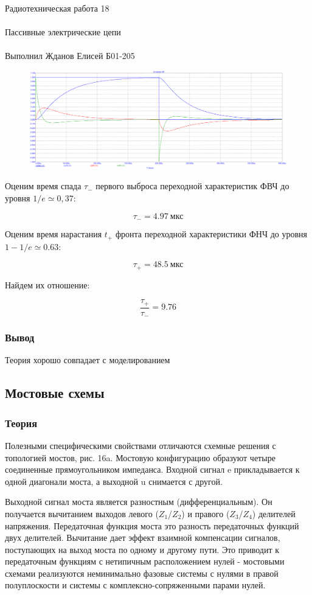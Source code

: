 \documentclass{astroedu-lab}
\begin{document}
\begin{problem}{\huge Радиотехническая работа 18\\\\Пассивные электрические цепи\\\\Выполнил Жданов Елисей Б01-205}
\begin{figure}[!h]
	\centering
	\includegraphics[width=1\textwidth]{2_3.png}
	\label{fig:boiler}
\end{figure}

Оценим время спада $\tau_-$ первого выброса переходной характеристик ФВЧ до уровня $1/e \simeq 0,37$:

\[\tau_-= 4.97 \: \text{мкс}\]

Оценим время нарастания $t_+$ фронта переходной характеристики ФНЧ до уровня $1 - 1/e \simeq 0.63$:

\[\tau_+ = 48.5 \: \text{мкс}\]

Найдем их отношение:

\[\frac{\tau_+}{\tau_-} = 9.76\]


\subsubsection{Вывод}

Теория хорошо совпадает с моделированием

\subsection{Мостовые схемы}

\subsubsection{Теория}

Полезными специфическими свойствами отличаются схемные
решения с топологией мостов, рис. 16a. Мостовую конфигурацию образуют четыре соединенные прямоугольником импеданса. Входной сигнал e прикладывается к одной диагонали моста, а выходной u снимается с другой.

Выходной сигнал моста является разностным (дифференциальным). Он получается вычитанием выходов левого ($Z_1$/$Z_2$) и правого ($Z_3$/$Z_4$) делителей напряжения. Передаточная функция моста это разность передаточных функций двух делителей. Вычитание дает эффект взаимной компенсации сигналов, поступающих на выход моста по одному и другому пути. Это приводит к передаточным функциям с нетипичным расположением нулей - мостовыми схемами реализуются неминимально фазовые системы с нулями в правой полуплоскости и системы с комплексно-сопряженными парами нулей.


\end{problem}
\end{document}
